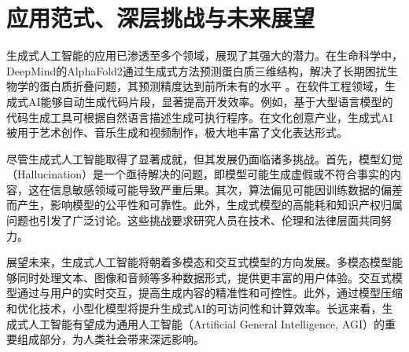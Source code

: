\documentclass{ctexart}
\begin{document}
\section{应用范式、深层挑战与未来展望}

生成式人工智能的应用已渗透至多个领域，展现了其强大的潜力。在生命科学中，DeepMind的AlphaFold2通过生成式方法预测蛋白质三维结构，解决了长期困扰生物学的蛋白质折叠问题，其预测精度达到前所未有的水平 \cite{bryant2022improved}。在软件工程领域，生成式AI能够自动生成代码片段，显著提高开发效率。例如，基于大型语言模型的代码生成工具可根据自然语言描述生成可执行程序。在文化创意产业，生成式AI被用于艺术创作、音乐生成和视频制作，极大地丰富了文化表达形式。

尽管生成式人工智能取得了显著成就，但其发展仍面临诸多挑战。首先，模型幻觉（Hallucination）是一个亟待解决的问题\cite{ji2023survey}，即模型可能生成虚假或不符合事实的内容，这在信息敏感领域可能导致严重后果。其次，算法偏见可能因训练数据的偏差而产生，影响模型的公平性和可靠性。此外，生成式模型的高能耗和知识产权归属问题也引发了广泛讨论。这些挑战要求研究人员在技术、伦理和法律层面共同努力。

展望未来，生成式人工智能将朝着多模态和交互式模型的方向发展。多模态模型能够同时处理文本、图像和音频等多种数据形式，提供更丰富的用户体验。交互式模型通过与用户的实时交互，提高生成内容的精准性和可控性。此外，通过模型压缩和优化技术，小型化模型将提升生成式AI的可访问性和计算效率。长远来看，生成式人工智能有望成为通用人工智能（Artificial General Intelligence, AGI）\cite{goertzel2014artificial}的重要组成部分，为人类社会带来深远影响。

\newpage
\printbibliography
\end{document}
